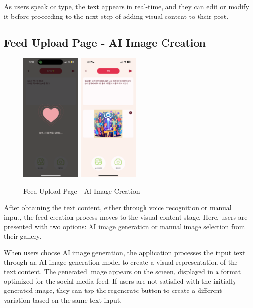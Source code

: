 \documentclass[conference]{IEEEtran}
\begin{document}
        As users speak or type, the text appears in real-time, and they can edit or modify it before proceeding to the next step of adding visual content to their post.

 \subsection{Feed Upload Page - AI Image Creation}
        \begin{figure}[htbp]
            \centerline{
            \includegraphics[width=3cm]{Images/page/creating.png}
            \includegraphics[width=3cm]{Images/page/writing.png}}
              \caption{Feed Upload Page - AI Image Creation}
            \label{fig}
        \end{figure}
        After obtaining the text content, either through voice recognition or manual input, the feed creation process moves to the visual content stage. Here, users are presented with two options: AI image generation or manual image selection from their gallery.

        When users choose AI image generation, the application processes the input text through an AI image generation model to create a visual representation of the text content. The generated image appears on the screen, displayed in a format optimized for the social media feed. If users are not satisfied with the initially generated image, they can tap the regenerate button to create a different variation based on the same text input.
\end{document}
